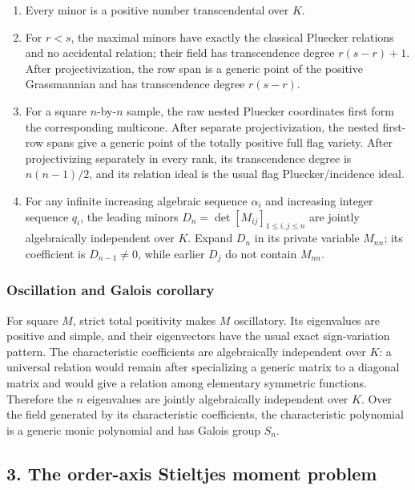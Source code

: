\begin{enumerate}
\def\labelenumi{\arabic{enumi}.}
\tightlist
\item
  Every minor is a positive number transcendental over \(K\).
\item
  For \(r<s\), the maximal minors have exactly the classical Pluecker
  relations and no accidental relation; their field has transcendence
  degree \(r(s-r)+1\). After projectivization, the row span is a generic
  point of the positive Grassmannian and has transcendence degree
  \(r(s-r)\).
\item
  For a square \(n\)-by-\(n\) sample, the raw nested Pluecker coordinates
  first form the corresponding multicone.  After separate projectivization,
  the nested first-row spans give a generic point of the totally positive
  full flag variety.
  After projectivizing separately in every rank, its transcendence degree
  is \(n(n-1)/2\), and its relation ideal is the usual flag
  Pluecker/incidence ideal.
\item
  For any infinite increasing algebraic sequence \(\alpha_i\) and increasing
  integer sequence \(q_i\), the leading minors
  \(D_n=\det[M_{ij}]_{1\le i,j\le n}\) are jointly algebraically independent
  over \(K\). Expand \(D_n\) in its private variable \(M_{nn}\); its
  coefficient is \(D_{n-1}\ne0\), while earlier \(D_j\) do not contain
  \(M_{nn}\).
\end{enumerate}

\subsubsection{Oscillation and Galois corollary}

For square \(M\), strict total positivity makes \(M\) oscillatory. Its
eigenvalues are positive and simple, and their eigenvectors have the usual
exact sign-variation pattern. The characteristic coefficients are
algebraically independent over \(K\): a universal relation would remain
after specializing a generic matrix to a diagonal matrix and would give a
relation among elementary symmetric functions. Therefore the \(n\)
eigenvalues are jointly algebraically independent over \(K\). Over the field
generated by its characteristic coefficients, the characteristic polynomial
is a generic monic polynomial and has Galois group \(S_n\).

\subsection{3. The order-axis Stieltjes moment problem}


